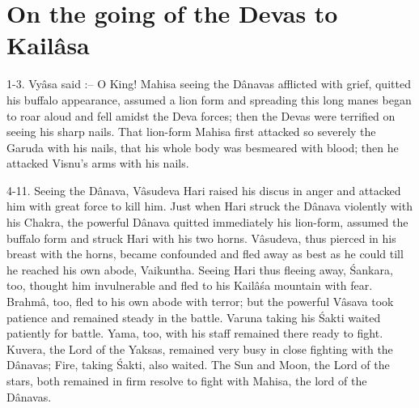 ﻿\chapter{On the going of the Devas to Kail\^asa}

1-3. Vy\^asa said :-- O King! Mahisa seeing the D\^anavas afflicted with grief, quitted his buffalo appearance, assumed a lion form and spreading this long manes began to roar aloud and fell amidst the Deva forces; then the Devas were terrified on seeing his sharp nails. That lion-form Mahisa first attacked so severely the Garuda with his nails, that his whole body was besmeared with blood; then he attacked Visnu's arms with his nails.

4-11. Seeing the D\^anava, V\^asudeva Hari raised his discus in anger and attacked him with great force to kill him. Just when Hari struck the D\^anava violently with his Chakra, the powerful D\^anava quitted immediately his lion-form, assumed the buffalo form and struck Hari with his two horns. V\^asudeva, thus pierced in his breast with the horns, became confounded and fled away as best as he could till he reached his own abode, Vaikuntha. Seeing Hari thus fleeing away, \'Sankara, too, thought him invulnerable and fled to his Kail\^a\'sa mountain with fear. Brahm\^a, too, fled to his own abode with terror; but the powerful V\^asava took patience and remained steady in the battle. Varuna taking his \'Sakti waited patiently for battle. Yama, too, with his staff remained there ready to fight. Kuvera, the Lord of the Yaksas, remained very busy in close fighting with the D\^anavas; Fire, taking \'Sakti, also waited. The Sun and Moon, the Lord of the stars, both remained in firm resolve to fight with Mahisa, the lord of the D\^anavas.

